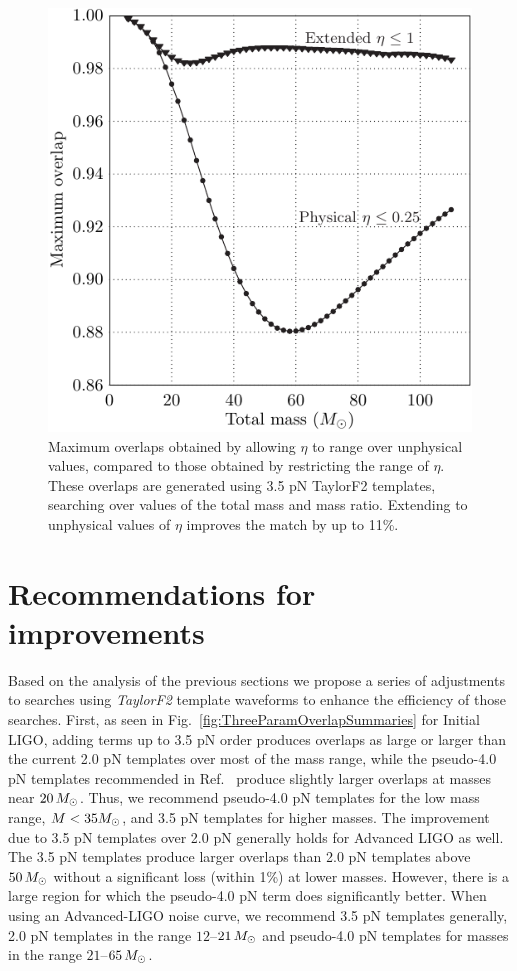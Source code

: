 \begin{figure}
  \begin{center}
    \includegraphics[width=0.55\linewidth]{figures/comparison/PhysicalAndUnphysicalEta}
  \end{center}
  \caption[Maximum overlaps obtained by allowing $\eta$ to range over unphysical values]{
  \label{fig:PhysicalEta}
    Maximum overlaps obtained by allowing $\eta$ to range over
    unphysical values, compared to those obtained by restricting the
    range of $\eta$.  These overlaps are generated using 3.5 pN
    TaylorF2 templates, searching over values of the total mass and
    mass ratio.  Extending to unphysical values of $\eta$ improves the
    match by up to 11\%.}
\end{figure}%


\section{Recommendations for improvements}
\label{sec:Recommendations} %

Based on the analysis of the previous sections we propose a series of
adjustments to searches using \textit{TaylorF2} template waveforms to
enhance the efficiency of those searches.  First, as seen in
Fig.~\ref{fig:ThreeParamOverlapSummaries} for Initial LIGO, adding
terms up to 3.5 pN order produces overlaps as large or larger than the
current 2.0 pN templates over most of the mass range, while the
pseudo-4.0 pN templates recommended in Ref.~\cite{Pan2007} produce
slightly larger overlaps at masses near $20\,M_{\odot}$.  Thus, we
recommend pseudo-4.0 pN templates for the low mass range, $M < 35
M_{\odot}$, and 3.5 pN templates for higher masses.  The improvement due
to 3.5 pN templates over 2.0 pN generally holds for Advanced LIGO as
well.  The 3.5 pN templates produce larger overlaps than 2.0 pN
templates above $50\,M_{\odot}$ without a significant loss (within 1\%) at
lower masses.  However, there is a large region for which the
pseudo-4.0 pN term does significantly better.  When using an
Advanced-LIGO noise curve, we recommend 3.5 pN templates generally,
2.0 pN templates in the range $12$--$21\,M_{\odot}$ and pseudo-4.0 pN
templates for masses in the range $21$--$65\,M_{\odot}$.

